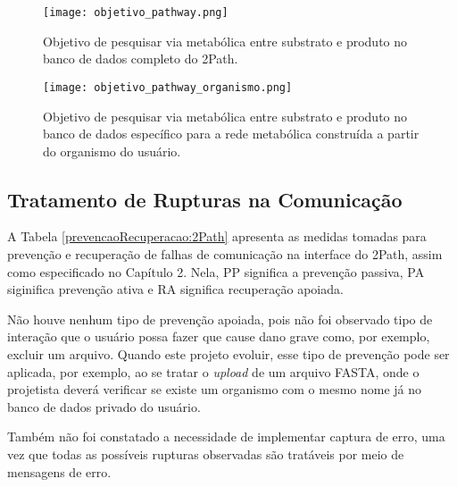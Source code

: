 \begin{figure}[!h]
    \centering
    \texttt{[image: objetivo\_pathway.png]}
    \caption{Objetivo de pesquisar via metabólica entre substrato e produto no banco de dados completo do 2Path.}
    \label{fig:objetivo_pathway}
\end{figure}
\break
\begin{figure}[!h]
    \centering
    \texttt{[image: objetivo\_pathway\_organismo.png]}
    \caption{Objetivo de pesquisar via metabólica entre substrato e produto no banco de dados  específico para a rede metabólica construída a partir do organismo do usuário.}
    \label{fig:objetivo_pathway_organismo}
\end{figure}

\subsection{Tratamento de Rupturas na Comunicação}

\indent A Tabela \ref{prevencaoRecuperacao:2Path} apresenta as medidas tomadas para prevenção e recuperação de falhas de comunicação na interface do 2Path, assim como especificado no Capítulo 2. Nela, PP significa a prevenção passiva, PA siginifica prevenção ativa e RA significa recuperação apoiada. 

\indent Não houve nenhum tipo de prevenção apoiada, pois não foi observado tipo de interação que o usuário possa fazer que cause dano grave como, por exemplo, excluir um arquivo. Quando este projeto evoluir, esse tipo de prevenção pode ser aplicada, por exemplo, ao se tratar o \textit{upload} de um arquivo FASTA, onde o projetista deverá verificar se existe um organismo com o mesmo nome já no banco de dados privado do usuário. 

\indent Também não foi constatado a necessidade de implementar captura de erro, uma vez que todas as possíveis rupturas observadas são tratáveis por meio de mensagens de erro.

